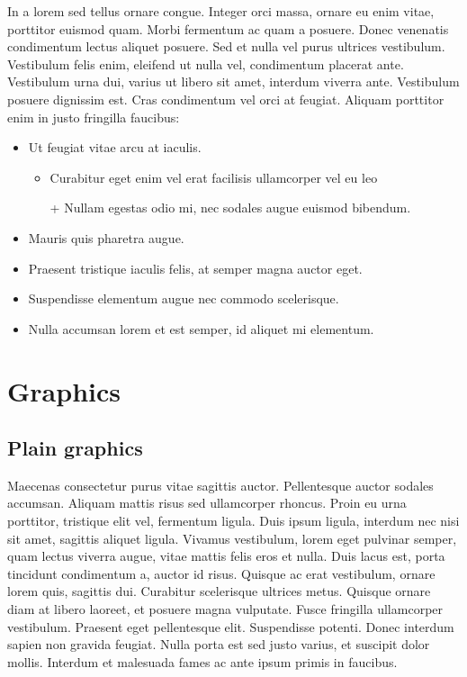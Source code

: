 \documentclass[10pt]{article}
\begin{document}
In a lorem sed tellus ornare congue. Integer orci massa, ornare eu enim vitae, porttitor euismod quam. Morbi fermentum ac quam a posuere. Donec venenatis condimentum lectus aliquet posuere. Sed et nulla vel purus ultrices vestibulum. Vestibulum felis enim, eleifend ut nulla vel, condimentum placerat ante. Vestibulum urna dui, varius ut libero sit amet, interdum viverra ante. Vestibulum posuere dignissim est. Cras condimentum vel orci at feugiat. Aliquam porttitor enim in justo fringilla faucibus:

\begin{itemize}
\item{Ut feugiat vitae arcu at iaculis.
\begin{itemize}
\item{Curabitur eget enim vel erat facilisis ullamcorper vel eu leo}
\item[+]{Nullam egestas odio mi, nec sodales augue euismod bibendum.}
\end{itemize}}
\item{Mauris quis pharetra augue.}
\item{Praesent tristique iaculis felis, at semper magna auctor eget.}
\item{Suspendisse elementum augue nec commodo scelerisque.}
\item{Nulla accumsan lorem et est semper, id aliquet mi elementum.}
\end{itemize}

\section{Graphics}

\subsection{Plain graphics}

Maecenas consectetur purus vitae sagittis auctor. Pellentesque auctor sodales accumsan. Aliquam mattis risus sed ullamcorper rhoncus. Proin eu urna porttitor, tristique elit vel, fermentum ligula. Duis ipsum ligula, interdum nec nisi sit amet, sagittis aliquet ligula. Vivamus vestibulum, lorem eget pulvinar semper, quam lectus viverra augue, vitae mattis felis eros et nulla. Duis lacus est, porta tincidunt condimentum a, auctor id risus. Quisque ac erat vestibulum, ornare lorem quis, sagittis dui. Curabitur scelerisque ultrices metus. Quisque ornare diam at libero laoreet, et posuere magna vulputate. Fusce fringilla ullamcorper vestibulum. Praesent eget pellentesque elit. Suspendisse potenti. Donec interdum sapien non gravida feugiat. Nulla porta est sed justo varius, et suscipit dolor mollis. Interdum et malesuada fames ac ante ipsum primis in faucibus.
\end{document}
